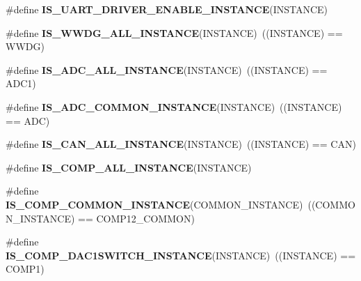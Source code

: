 \begin{DoxyCompactItemize}
\#define {\bfseries I\+S\+\_\+\+U\+A\+R\+T\+\_\+\+D\+R\+I\+V\+E\+R\+\_\+\+E\+N\+A\+B\+L\+E\+\_\+\+I\+N\+S\+T\+A\+N\+CE}(I\+N\+S\+T\+A\+N\+CE)
\item 
\mbox{\label{group___exported__macro_gac2a8aaec233e19987232455643a04d6f}} 
\#define {\bfseries I\+S\+\_\+\+W\+W\+D\+G\+\_\+\+A\+L\+L\+\_\+\+I\+N\+S\+T\+A\+N\+CE}(I\+N\+S\+T\+A\+N\+CE)~((I\+N\+S\+T\+A\+N\+CE) == W\+W\+DG)
\item 
\mbox{\label{group___exported__macro_ga2204b62b378bcf08b3b9006c184c7c23}} 
\#define {\bfseries I\+S\+\_\+\+A\+D\+C\+\_\+\+A\+L\+L\+\_\+\+I\+N\+S\+T\+A\+N\+CE}(I\+N\+S\+T\+A\+N\+CE)~((I\+N\+S\+T\+A\+N\+CE) == A\+D\+C1)
\item 
\mbox{\label{group___exported__macro_gad8a5831c786b6b265531b890a194cbe2}} 
\#define {\bfseries I\+S\+\_\+\+A\+D\+C\+\_\+\+C\+O\+M\+M\+O\+N\+\_\+\+I\+N\+S\+T\+A\+N\+CE}(I\+N\+S\+T\+A\+N\+CE)~((I\+N\+S\+T\+A\+N\+CE) == A\+DC)
\item 
\mbox{\label{group___exported__macro_ga974dd363bcb2a5f48ec032509fd4ece3}} 
\#define {\bfseries I\+S\+\_\+\+C\+A\+N\+\_\+\+A\+L\+L\+\_\+\+I\+N\+S\+T\+A\+N\+CE}(I\+N\+S\+T\+A\+N\+CE)~((I\+N\+S\+T\+A\+N\+CE) == C\+AN)
\item 
\#define {\bfseries I\+S\+\_\+\+C\+O\+M\+P\+\_\+\+A\+L\+L\+\_\+\+I\+N\+S\+T\+A\+N\+CE}(I\+N\+S\+T\+A\+N\+CE)
\item 
\mbox{\label{group___exported__macro_gaa7c8a0729f6b2a35ce000556078fa737}} 
\#define {\bfseries I\+S\+\_\+\+C\+O\+M\+P\+\_\+\+C\+O\+M\+M\+O\+N\+\_\+\+I\+N\+S\+T\+A\+N\+CE}(C\+O\+M\+M\+O\+N\+\_\+\+I\+N\+S\+T\+A\+N\+CE)~((C\+O\+M\+M\+O\+N\+\_\+\+I\+N\+S\+T\+A\+N\+CE) == C\+O\+M\+P12\+\_\+\+C\+O\+M\+M\+ON)
\item 
\mbox{\label{group___exported__macro_gaf2340c4592a47c171624fc99e43e4da5}} 
\#define {\bfseries I\+S\+\_\+\+C\+O\+M\+P\+\_\+\+D\+A\+C1\+S\+W\+I\+T\+C\+H\+\_\+\+I\+N\+S\+T\+A\+N\+CE}(I\+N\+S\+T\+A\+N\+CE)~((I\+N\+S\+T\+A\+N\+CE) == C\+O\+M\+P1)
\item 
\mbox{\label{group___exported__macro_gab7f78e841f84bf7ec834748ca685fbc0}} 

\end{DoxyCompactItemize}
